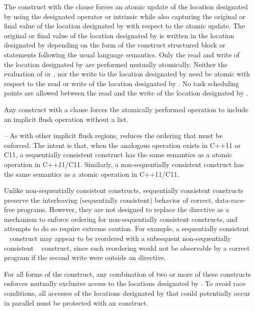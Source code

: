 The  construct with the  clause forces an atomic update of the 
location designated by  using the designated operator or intrinsic while also capturing 
the original or final value of the location designated by  with respect to the atomic 
update. The original or final value of the location designated by  is written in the 
location designated by  depending on the form of the  construct structured 
block or statements following the usual language semantics. Only the read and write of 
the location designated by  are performed mutually atomically. Neither the evaluation 
of  or , nor the write to the location designated by  need be atomic with 
respect to the read or write of the location designated by . No task scheduling points 
are allowed between the read and the write of the location designated by .

Any  construct with a  clause forces the atomically performed 
operation to include an implicit flush operation without a list.

\notestart
\noteheader – As with other implicit flush regions, 
reduces the 
ordering that must be enforced. The intent is that, when the analogous operation exists 
in C++11 or C11, a sequentially consistent  construct has the same semantics as 
a  atomic operation in C++11/C11. Similarly, a 
non-sequentially consistent  construct has the same semantics as a 
 atomic operation in C++11/C11.

Unlike non-sequentially consistent  constructs, sequentially consistent  
constructs preserve the interleaving (sequentially consistent) behavior of correct, 
data-race-free programs. However, they are not designed to replace the  directive 
as a mechanism to enforce ordering for non-sequentially consistent  constructs, 
and attempts to do so require extreme caution. For example, a sequentially consistent 
~ construct may appear to be reordered with a subsequent 
non-sequentially consistent ~ construct, since such reordering would not 
be observable by a correct program if the second write were outside an  
directive.
\noteend

For all forms of the  construct, any combination of two or more of these 
 constructs enforces mutually exclusive access to the locations designated by . 
To avoid race conditions, all accesses of the locations designated by  that could 
potentially occur in parallel must be protected with an  construct. 

